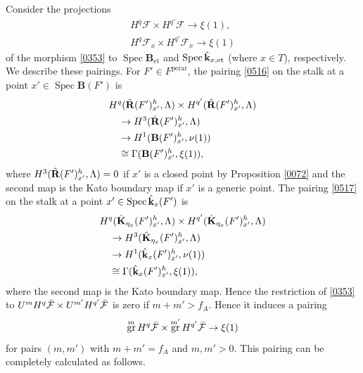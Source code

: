 \documentclass{amsart}
\theoremstyle{remark}
\numberwithin{equation}{subsection}
\newcommand{\et}{\mathrm{et}}
\newcommand{\perar}{\mathrm{perar}}
\newcommand{\alg}[1]{\mathbf{#1}}
\DeclareMathOperator{\Spec}{Spec}
\DeclareMathOperator{\gr}{gr}
\begin{document}
Consider the projections
	\begin{gather} \label{0516}
				H^{q} \mathcal{F} \times H^{q'} \mathcal{F}
			\to
				\xi(1),
		\\ \label{0517}
				H^{q} \mathcal{F}_{x} \times H^{q'} \mathcal{F}_{x}
			\to
				\xi(1)
	\end{gather}
of the morphism \eqref{0353} to
$\Spec \alg{B}_{\et}$ and $\Spec \Hat{\alg{k}}_{x, \et}$ (where $x \in T$), respectively.
We describe these pairings.
For $F' \in F^{\perar}$,
the pairing \eqref{0516} on the stalk at a point $x' \in \Spec \alg{B}(F')$ is
	\begin{align*}
		&
					H^{q}(\Hat{\alg{R}}(F')_{x'}^{h}, \Lambda)
				\times
					H^{q'}(\Hat{\alg{R}}(F')_{x'}^{h}, \Lambda)
		\\
		&	\quad
			\to
					H^{3}(\Hat{\alg{R}}(F')_{x'}^{h}, \Lambda)
		\\
		&	\quad
			\to
				H^{1}(\alg{B}(F')_{x'}^{h}, \nu(1))
		\\
		&	\quad
			\cong
				\Gamma(\alg{B}(F')_{x'}^{h}, \xi(1)),
	\end{align*}
where $H^{3}(\Hat{\alg{R}}(F')_{x'}^{h}, \Lambda) = 0$ if $x'$ is a closed point
by Proposition \ref{0072}
and the second map is the Kato boundary map if $x'$ is a generic point.
The pairing \eqref{0517} on the stalk at a point $x' \in \Spec \Hat{\alg{k}}_{x}(F')$ is
	\begin{align*}
		&
					H^{q}(\Hat{\alg{K}}_{\eta_{x}}(F')_{x'}^{h}, \Lambda)
				\times
					H^{q'}(\Hat{\alg{K}}_{\eta_{x}}(F')_{x'}^{h}, \Lambda)
		\\
		&	\quad
			\to
					H^{3}(\Hat{\alg{K}}_{\eta_{x}}(F')_{x'}^{h}, \Lambda)
		\\
		&	\quad
			\to
				H^{1}(\Hat{\alg{k}}_{x}(F')_{x'}^{h}, \nu(1))
		\\
		&	\quad
			\cong
				\Gamma(\Hat{\alg{k}}_{x}(F')_{x'}^{h}, \xi(1)),
	\end{align*}
where the second map is the Kato boundary map.
Hence the restriction of \eqref{0353} to
$U^{m} H^{q} \Bar{\mathcal{F}} \times U^{m'} H^{q'} \Bar{\mathcal{F}}$
is zero if $m + m' > f_{A}$.
Hence it induces a pairing
	\begin{equation} \label{0106}
			\gr^{m} H^{q} \Bar{\mathcal{F}} \times \gr^{m'} H^{q'} \Bar{\mathcal{F}}
		\to
			\xi(1)
	\end{equation}
for pairs $(m, m')$ with $m + m' = f_{A}$ and $m, m' > 0$.
This pairing can be completely calculated as follows.
\end{document}
